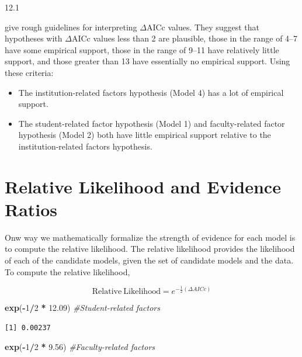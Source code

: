 \documentclass[]{book}
\newenvironment{Shaded}{\begin{snugshade}}{\end{snugshade}}
\newcommand{\CommentTok}[1]{\textcolor[rgb]{0.56,0.35,0.01}{\textit{#1}}}
\newcommand{\DecValTok}[1]{\textcolor[rgb]{0.00,0.00,0.81}{#1}}
\newcommand{\FloatTok}[1]{\textcolor[rgb]{0.00,0.00,0.81}{#1}}
\newcommand{\KeywordTok}[1]{\textcolor[rgb]{0.13,0.29,0.53}{\textbf{#1}}}
\newcommand{\NormalTok}[1]{#1}
\newcommand{\OperatorTok}[1]{\textcolor[rgb]{0.81,0.36,0.00}{\textbf{#1}}}
\newcommand{\StringTok}[1]{\textcolor[rgb]{0.31,0.60,0.02}{#1}}
\providecommand{\tightlist}{%
  \setlength{\itemsep}{0pt}\setlength{\parskip}{0pt}}
\begin{document}
12.1

\citet[p.~25]{Burnham:2011} give rough guidelines for interpreting \(\Delta\)AICc values. They suggest that hypotheses with \(\Delta\)AICc values less than 2 are plausible, those in the range of 4--7 have some empirical support, those in the range of 9--11 have relatively little support, and those greater than 13 have essentially no empirical support. Using these criteria:

\begin{itemize}
\tightlist
\item
  The institution-related factors hypothesis (Model 4) has a lot of empirical support.
\item
  The student-related factor hypothesis (Model 1) and faculty-related factor hypothesis (Model 2) both have little empirical support relative to the institution-related factors hypothesis.
\end{itemize}

\hypertarget{relative-likelihood-and-evidence-ratios}{%
\section{Relative Likelihood and Evidence Ratios}\label{relative-likelihood-and-evidence-ratios}}

Onw way we mathematically formalize the strength of evidence for each model is to compute the relative likelihood. The relative likelihood provides the likelihood of each of the candidate models, given the set of candidate models and the data. To compute the relative likelihood,

\[
\mathrm{Relative~Likelihood} = e ^ {−\frac{1}{2} (\Delta AICc)}
\]

\begin{Shaded}
\begin{Highlighting}[]
\KeywordTok{exp}\NormalTok{(}\OperatorTok{-}\DecValTok{1}\OperatorTok{/}\DecValTok{2} \OperatorTok{*}\StringTok{ }\FloatTok{12.09}\NormalTok{) }\CommentTok{#Student-related factors}
\end{Highlighting}
\end{Shaded}

\begin{verbatim}
[1] 0.00237
\end{verbatim}

\begin{Shaded}
\begin{Highlighting}[]
\KeywordTok{exp}\NormalTok{(}\OperatorTok{-}\DecValTok{1}\OperatorTok{/}\DecValTok{2} \OperatorTok{*}\StringTok{  }\FloatTok{9.56}\NormalTok{) }\CommentTok{#Faculty-related factors}
\end{Highlighting}
\end{Shaded}
\end{document}
